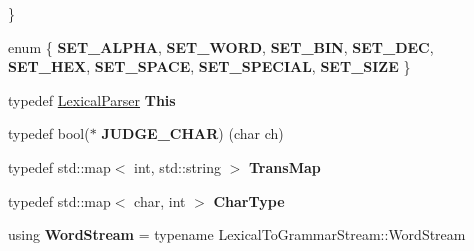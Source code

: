 \begin{DoxyCompactItemize}
 \}
\item 
\mbox{\label{classx2_1_1_lexical_parser_ab9bf3af0acdca4958080513ae4bffb2e}} 
enum \{ \newline
{\bfseries S\+E\+T\+\_\+\+A\+L\+P\+HA}, 
{\bfseries S\+E\+T\+\_\+\+W\+O\+RD}, 
{\bfseries S\+E\+T\+\_\+\+B\+IN}, 
{\bfseries S\+E\+T\+\_\+\+D\+EC}, 
\newline
{\bfseries S\+E\+T\+\_\+\+H\+EX}, 
{\bfseries S\+E\+T\+\_\+\+S\+P\+A\+CE}, 
{\bfseries S\+E\+T\+\_\+\+S\+P\+E\+C\+I\+AL}, 
{\bfseries S\+E\+T\+\_\+\+S\+I\+ZE}
 \}
\item 
\mbox{\label{classx2_1_1_lexical_parser_a2888218380e69d89c1e05ff4b6080aa6}} 
typedef \hyperlink{classx2_1_1_lexical_parser}{Lexical\+Parser} {\bfseries This}
\item 
\mbox{\label{classx2_1_1_lexical_parser_a6b384459924122c338c117307e0a90f8}} 
typedef bool($\ast$ {\bfseries J\+U\+D\+G\+E\+\_\+\+C\+H\+AR}) (char ch)
\item 
\mbox{\label{classx2_1_1_lexical_parser_aaf7b341c51dcd3f1bfe0773e68c91209}} 
typedef std\+::map$<$ int, std\+::string $>$ {\bfseries Trans\+Map}
\item 
\mbox{\label{classx2_1_1_lexical_parser_a1b56b8aa6baecaa64fa6d1d0992d89f1}} 
typedef std\+::map$<$ char, int $>$ {\bfseries Char\+Type}
\item 
\mbox{\label{classx2_1_1_lexical_parser_aa46a59aa1c34176e923676c9518f5f75}} 
using {\bfseries Word\+Stream} = typename Lexical\+To\+Grammar\+Stream\+::\+Word\+Stream
\end{DoxyCompactItemize}
